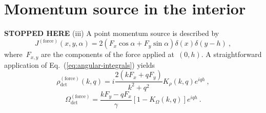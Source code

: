 \documentclass[preprint,aps,eqsecnum, prb]{revtex4-1}
\newcommand{\dct}[1]{{#1}_\mathrm{dct}}
\begin{document}
\section{Momentum source in the interior}
\label{sec:stokeslet}

{\bf STOPPED HERE}
(iii) A point momentum source is described by
\begin{equation}
  \label{eq:source-force-J}
  J^\mathrm{(force)}(x, y, \alpha)
  = 2 (F_x \cos\alpha + F_y \sin\alpha) \delta(x) \delta(y - h)
\ ,
\end{equation}
where~$F_{x, y}$ are the components of the force applied at~$(0, h)$.
A straightforward application of Eq.~(\ref{eq:angular-integrals}) yields
\begin{equation}
  \label{eq:source-force-rho}
  \dct{\rho}^\mathrm{(force)}(k, q)
      =  i \frac{2(k F_x + q F_y)}{k^2 + q^2}
               K_\rho(k, q)  e^{i q h}\ ,
\end{equation}
\begin{equation}
  \label{eq:source-force-omega}
  \dct{\Omega}^\mathrm{(force)} = \frac{kF_y - q F_x}{\gamma}
                                    \left[1 - K_\Omega(k, q)\right] e^{i q h}
  \ .
\end{equation}
\end{document}
